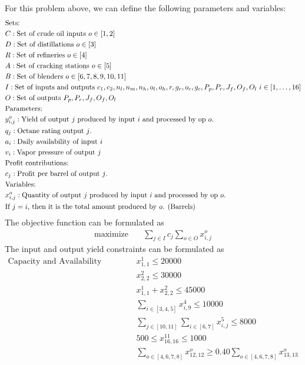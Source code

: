 \documentclass[11pt]{article}
\begin{document}
For this problem above, we can define the following parameters and variables:
\begin{align*}
& \text{Sets: } \\
& C: \text{Set of crude oil inputs } o \in [1,2] \\
& D: \text{Set of distillations } o \in [3] \\
& R: \text{Set of refineries } o \in [4] \\
& A: \text{Set of cracking stations } o \in [5] \\
& B: \text{Set of blenders } o \in [6,7,8,9,10,11] \\
& I: \text{Set of inputs and outputs $c_1,c_2,n_l, n_m, n_h, o_l, o_h, r, g_r, o_c, g_c, P_p, P_r, J_f, O_f, O_l$ } i \in [1,\dots,16] \\
& O: \text{Set of outputs $ P_p, P_r, J_f, O_f, O_l$} \\
& \text{Parameters:} \\
& y_{i,j}^o: \text{Yield of output $j$ produced by input $i$ and processed by op $ o$.} \\
& q_{j}: \text{Octane rating output $j$.} \\
& a_i: \text{Daily availability of input $i$} \\
& v_i: \text{Vapor pressure of output $j$} \\
& \text{Profit contributions:} \\
& c_{j}: \text{Profit per barrel of output $j$.} \\
& \text{Variables:} \\
& x_{i,j}^o : \text{Quantity of output $j$ produced by input $i$ and processed by op $o$.} \\
& \text{If $j=i$, then it is the total amount produced by $o$. (Barrels)} \\
\end{align*}
The objective function can be formulated as 
\begin{align*}
  \text{maximize} & \quad  \sum_{j \in I} c_{j} \sum_{o \in O} x_{i,j}^o
\end{align*}
The input and output yield constraints can be formulated as
\begin{align*}
  \text{Capacity and Availability Constraints} & \quad x_{1,1}^1 \leq 20000 \\ 
  & \quad x_{2,2}^2 \leq 30000 \\
  & \quad x_{1,1}^1 + x_{2,2}^2 \leq 45000 \\
  & \quad \sum_{i \in [3,4,5]} x_{i,9}^4 \leq 10000 \\
  & \quad \sum_{j \in [10,11]} \sum_{i \in [6,7]} x_{i,j}^5 \leq 8000 \\
  & \quad 500 \leq x_{16,16}^{11} \leq 1000 \\
  & \quad \sum_{o \in [4,6,7,8]} x_{12,12}^o \geq 0.40 \sum_{o \in [4,6,7,8]} x_{13,13}^o
\end{align*}
\end{document}
